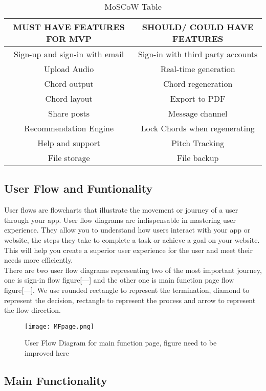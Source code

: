 \begin{table}[ht]
\centering
\begin{tabular}{ |c|c| } 
 \hline
\textbf{MUST HAVE FEATURES FOR MVP} & \textbf{SHOULD/ COULD HAVE FEATURES}\\ 
 \hline
 Sign-up and sign-in with email & Sign-in with third party accounts \\ 
 \hline
 Upload Audio & Real-time generation \\ 
 \hline
 Chord output & Chord regeneration \\ 
 \hline
 Chord layout &  Export to PDF \\ 
 \hline
 Share posts & Message channel \\ 
 \hline
 Recommendation Engine &  Lock Chords when regenerating\\ 
 \hline
 Help and support &  Pitch Tracking\\ 
 \hline
 File storage& File backup \\ 
 \hline
 \end{tabular}
 \caption{MoSCoW Table}
 \centering
 \end{table}
 
 \subsection{User Flow and Funtionality}
User flows are flowcharts that illustrate the movement or journey of a user through your app. User flow diagrams are indispensable in mastering user experience. They allow you to understand how users interact with your app or website, the steps they take to complete a task or achieve a goal on your website. This will help you create a superior user experience for the user and meet their needs more efficiently.  
\\There are two user flow diagrams representing two of the most important journey, one is sign-in flow figure[---] and the other one is main function page flow figure[---]. We use rounded rectangle to represent the termination, diamond to represent the decision, rectangle to represent the process and arrow to represent the flow direction.

\begin{figure}
\centering
\texttt{[image: MFpage.png]}
\caption{User Flow Diagram for main function page, figure need to be improved here}
\end{figure}


\subsection*{Main Functionality}

